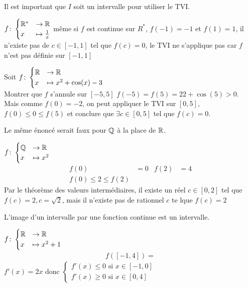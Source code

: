 \begin{remarque}
Il est important que $I$ soit un intervalle pour utiliser le TVI.
\end{remarque}
\begin{exemple}
$
f \colon 
\begin{cases}
\mathbb{R}^* &\to \mathbb{R} \\
x &\mapsto \frac{1}{x}
\end{cases}
$
même si $f$ est continue sur $R^*$, $f(-1) = -1$ et $f(1) = 1$, il n'existe pas de $c \in [-1, 1]$ tel que $f(c) = 0$, le TVI ne s'applique pas car $f$ n'est pas définie sur $[-1, 1]$
\end{exemple}

\begin{exemple}
Soit 
$
f \colon 
\begin{cases}
\mathbb{R} &\to \mathbb{R} \\
x &\mapsto x^2 + \cos(x) -3
\end{cases}
$ 
\\
Montrer que $f$ s'annule sur $[-5, 5]$ $f(-5) = f(5) = 22 + \cos(5) > 0 $. \\
Mais comme $f(0) = -2$, on peut appliquer le TVI sur $[0, 5]$, $f(0) \leq 0 \leq f(5)$ et conclure que $\exists c \in [0, 5]$ tel que $f(c) = 0$.
\end{exemple}

\begin{remarque}
Le même énoncé serait faux pour $\mathbb{Q}$ à la place de $\mathbb{R}$. 
\end{remarque}

\begin{exemple}
$
f \colon 
\begin{cases}
\mathbb{Q} &\to \mathbb{R} \\
x &\mapsto x^2
\end{cases}
$
\begin{align*}
f(0) &= 0 & f(2) &= 4 \\
f(0) \leq 2 \leq f(2)
\end{align*}
Par le théorème des valeurs intermédiaires, il existe un réel $c \in [0, 2]$ tel que $f(c) = 2, c = \sqrt{2}$, mais il n'existe pas de rationnel $c$ te lque $f(c) = 2$
\end{exemple}

\begin{remarque}
L'image d'un intervalle par une fonction continue est un intervalle.
\end{remarque}

\begin{exemple}
$
f \colon
\begin{cases}
\mathbb{R} &\to \mathbb{R} \\
x &\mapsto x^2 + 1
\end{cases}
$
\begin{align*}
f([-1, 4]) =
\end{align*}
$f'(x) = 2x$ donc 
$
\begin{cases}
f'(x) \leq 0 \text{ si } x \in [-1, 0] \\
f'(x) \geq 0 \text{ si } x \in [0, 4]
\end{cases}
$
\end{exemple}

